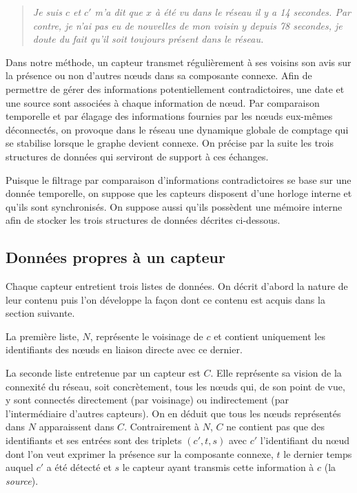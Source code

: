 \documentclass[10pt]{article}
\begin{document}
\begin{multicols}{2}
\begin{quote}
  \textit{Je suis $c$ et $c'$ m'a dit que $x$ à été vu dans le réseau
    il y a 14 secondes. Par contre, je n'ai pas eu de nouvelles de mon
    voisin $y$ depuis 78 secondes, je doute du fait qu'il soit
    toujours présent dans le réseau.}
\end{quote}

Dans notre méthode, un capteur transmet régulièrement à ses voisins
son avis sur la présence ou non d'autres n\oe uds dans sa composante
connexe. Afin de permettre de gérer des informations potentiellement
contradictoires, une date et une source sont associées à chaque
information de n\oe ud. Par comparaison temporelle et par élagage des
informations fournies par les n\oe uds eux-mêmes déconnectés, on
provoque dans le réseau une dynamique globale de comptage qui se
stabilise lorsque le graphe devient connexe. On précise par la suite
les trois structures de données qui serviront de support à ces
échanges.

Puisque le filtrage par comparaison d'informations contradictoires se
base sur une donnée temporelle, on suppose que les capteurs disposent
d'une horloge interne et qu'ils sont synchronisés. On suppose aussi
qu'ils possèdent une mémoire interne afin de stocker les trois
structures de données décrites ci-dessous.

\subsection*{Données propres à un capteur}

Chaque capteur entretient trois listes de données. On décrit d'abord
la nature de leur contenu puis l'on développe la façon dont ce contenu
est acquis dans la section suivante.

La première liste, $N$, représente le voisinage de $c$ et contient
uniquement les identifiants des n\oe uds en liaison directe avec ce
dernier.

La seconde liste entretenue par un capteur est $C$. Elle représente sa
vision de la connexité du réseau, soit concrètement, tous les n\oe uds
qui, de son point de vue, y sont connectés directement (par voisinage)
ou indirectement (par l'intermédiaire d'autres capteurs). On en déduit
que tous les n\oe uds représentés dans $N$ apparaissent dans
$C$. Contrairement à $N$, $C$ ne contient pas que des identifiants et
ses entrées sont des triplets $(c',t,s)$ avec $c'$ l'identifiant du
n\oe ud dont l'on veut exprimer la présence sur la composante connexe,
$t$ le dernier temps auquel $c'$ a été détecté et $s$ le capteur ayant
transmis cette information à $c$ (la \textit{source}).


\end{multicols}
\end{document}
